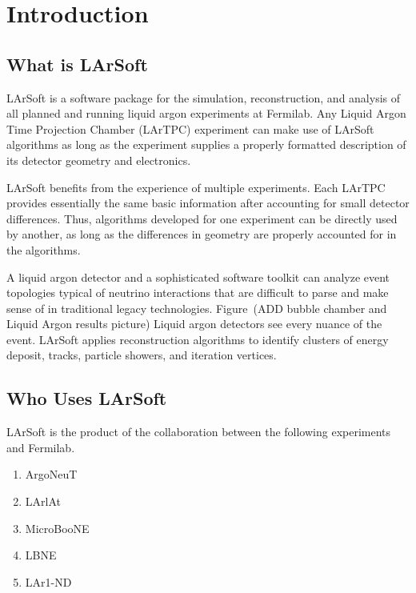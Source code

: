 \documentclass[12pt]{elsarticle}
\begin{document}
\section{Introduction}
\subsection{What is LArSoft}
LArSoft is a software package for the simulation, reconstruction, and analysis of all planned and running liquid argon experiments at Fermilab. Any Liquid Argon Time Projection Chamber (LArTPC) experiment can make use of LArSoft algorithms as long as the experiment supplies a properly formatted description of its detector geometry and electronics. 

LArSoft  benefits from the experience of multiple experiments.  Each LArTPC provides essentially the same basic information after accounting for small detector differences.  Thus, algorithms developed for one experiment can be directly used by another, as long as the differences in geometry are properly accounted for in the algorithms.  

A liquid argon detector and a sophisticated software toolkit can analyze event topologies typical of neutrino interactions that are difficult to parse and make sense of in traditional legacy technologies. Figure~(ADD bubble chamber and Liquid Argon results picture)
Liquid argon detectors see every nuance of the event. LArSoft applies reconstruction algorithms to identify clusters of energy deposit, tracks, particle showers, and iteration vertices.

\subsection{Who Uses LArSoft}
LArSoft is the product of the collaboration between the following experiments and Fermilab.
\begin{enumerate}
\item ArgoNeuT
\item LArlAt
\item MicroBooNE
\item LBNE
\item LAr1-ND
\end{enumerate}

\hspace*{2cm}
\begin{figure}[h]
\centering
\label{bubble}
\end{figure}
\end{document}
